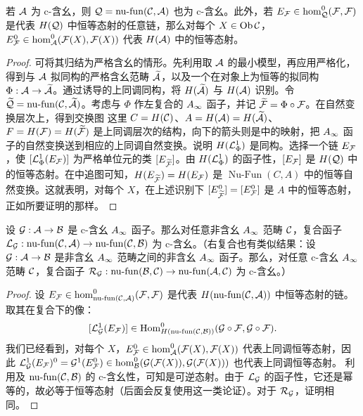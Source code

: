 \begin{lemma}\label{st:2.3}
若 $\A$ 为 c-含幺，则 $\Q=\nufun(\C,\A)$ 也为 c-含幺。此外，若 $E_{\F}\in\hom^0_{\Q}(\F,\F)$ 是代表 $H(\Q)$ 中恒等态射的任意链，那么对每个 $X\in\Ob\C$，$E^0_{\F}\in\hom^0_{\A}(\F(X),\F(X))$ 代表 $H(\A)$ 中的恒等态射。
\end{lemma}
\begin{proof}
可将其归结为严格含幺的情形。先利用取 $\A$ 的最小模型，再应用严格化，得到与 $\A$ 拟同构的严格含幺范畴 $\widetilde{\A}$，以及一个在对象上为恒等的拟同构 $\Phi:\A\to\widetilde{\A}$。通过诱导的上同调同构，将 $H(\widetilde{\A})$ 与 $H(\A)$ 识别。令 $\widetilde{\Q}=\nufun(\C,\widetilde{\A})$。考虑与 $\Phi$ 作左复合的 $\Ai$ 函子，并记 $\widetilde{\F}=\Phi\circ\F$。在自然变换层次上，得到交换图
这里 $C=H(\C)$、$A=H(\A)=H(\widetilde{\A})$、$F=H(\F)=H(\widetilde{\F})$ 是上同调层次的结构，向下的箭头则是中的映射，把 $\Ai$ 函子的自然变换送到相应的上同调自然变换。说明 $H(\LG^1_{\Phi})$ 是同构。选择一个链 $E_{\F}$，使 $[\LG^1_{\Phi}(E_{\F})]$ 为严格单位元的类 $[E_{\widetilde{\F}}]$。由 $H(\LG^1_{\Phi})$ 的函子性，$[E_{\F}]$ 是 $H(\Q)$ 中的恒等态射。在中追图可知，$H(E_{\widetilde{\F}})=H(E_{\F})$ 是 $\operatorname{Nu\text{-}Fun}(C,A)$ 中的恒等自然变换。这就表明，对每个 $X$，在上述识别下 $[E^0_{\widetilde{\F}}]=[E^0_{\F}]$ 是 $A$ 中的恒等态射，正如所要证明的那样。
\end{proof}

\begin{lemma}\label{st:2.4}
设 $\G:\A\to\B$ 是 c-含幺 $\Ai$ 函子。那么对任意非含幺 $\Ai$ 范畴 $\C$，复合函子 $\LG_{\G}:\nufun(\C,\A)\to\nufun(\C,\B)$ 为 c-含幺。（右复合也有类似结果：设 $\G:\A\to\B$ 是非含幺 $\Ai$ 范畴之间的非含幺 $\Ai$ 函子。那么，对任意 c-含幺 $\Ai$ 范畴 $\C$，复合函子 $\RG_{\G}:\nufun(\B,\C)\to\nufun(\A,\C)$ 为 c-含幺。）
\end{lemma}
\begin{proof}
设 $E_{\F}\in\hom^0_{\nufun(\C,\A)}(\F,\F)$ 是代表 $H(\nufun(\C,\A))$ 中恒等态射的链。取其在复合下的像：
\begin{equation}\label{eq:2.7}
[\LG^1_{\G}(E_{\F})]\in\Hom^0_{H(\nufun(\C,\B))}(\G\circ\F,\G\circ\F).
\end{equation}
我们已经看到，对每个 $X$，$E^0_{\F}\in\hom^0_{\A}(\F(X),\F(X))$ 代表上同调恒等态射，因此 $\LG^1_{\G}(E_{\F})^0=\G^1(E^0_{\F})\in\hom^0_{\B}(\G(\F(X)),\G(\F(X)))$ 也代表上同调恒等态射。
利用及 $\nufun(\C,\B)$ 的 c-含幺性，可知是可逆态射。由于 $\LG_{\G}$ 的函子性，它还是幂等的，故必等于恒等态射（后面会反复使用这一类论证）。对于 $\RG_{\G}$，证明相同。
\end{proof}

